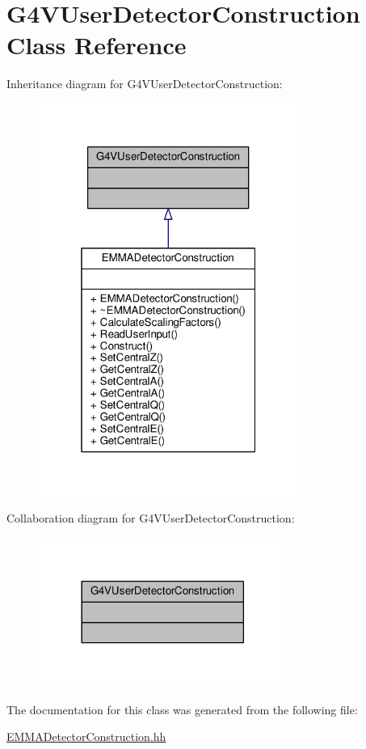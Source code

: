 \hypertarget{classG4VUserDetectorConstruction}{}\section{G4\+V\+User\+Detector\+Construction Class Reference}
\label{classG4VUserDetectorConstruction}


Inheritance diagram for G4\+V\+User\+Detector\+Construction\+:
\nopagebreak
\begin{figure}[H]
\begin{center}
\leavevmode
\includegraphics[width=241pt]{classG4VUserDetectorConstruction__inherit__graph}
\end{center}
\end{figure}


Collaboration diagram for G4\+V\+User\+Detector\+Construction\+:
\nopagebreak
\begin{figure}[H]
\begin{center}
\leavevmode
\includegraphics[width=230pt]{classG4VUserDetectorConstruction__coll__graph}
\end{center}
\end{figure}


The documentation for this class was generated from the following file\+:\begin{DoxyCompactItemize}
\item 
\hyperlink{EMMADetectorConstruction_8hh}{E\+M\+M\+A\+Detector\+Construction.\+hh}\end{DoxyCompactItemize}
